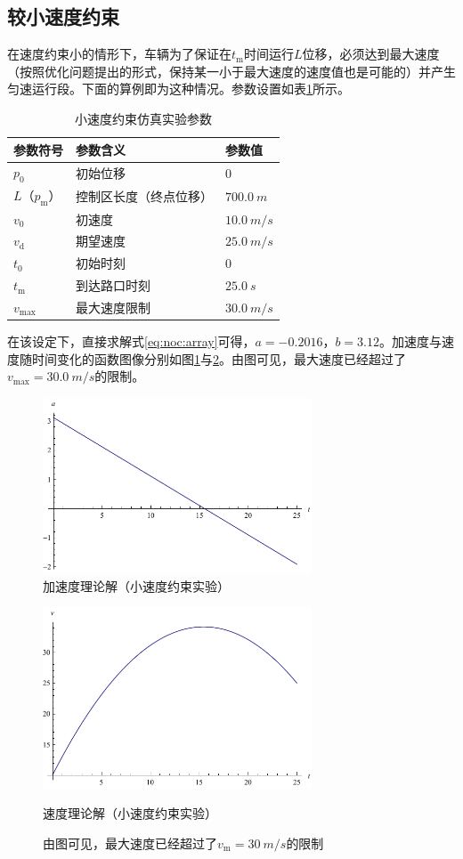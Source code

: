\subsection{较小速度约束}
在速度约束小的情形下，车辆为了保证在$t_\mathrm{m}$时间运行$L$位移，必须达到最大速度（按照优化问题提出的形式，保持某一小于最大速度的速度值也是可能的）并产生匀速运行段。下面的算例即为这种情况。参数设置如表\ref{tab:vsmall:param}所示。
\begin{table}[htbp]
\centering
\caption{小速度约束仿真实验参数}
\label{tab:vsmall:param}
\begin{tabular}{lll}
\toprule[1.5pt]
参数符号 & 参数含义 & 参数值 \\
\midrule[1pt]
$p_0$ & 初始位移 & $0$ \\
$L$（$p_\mathrm{m}$） & 控制区长度（终点位移） & $\SI{700.0}{m}$ \\
$v_0$ & 初速度 & $\SI{10.0}{m\per s}$ \\
$v_\mathrm{d}$ & 期望速度 & $\SI{25.0}{m\per s}$ \\
$t_0$ & 初始时刻 & $0$ \\
$t_\mathrm{m}$ & 到达路口时刻 & $\SI{25.0}{s}$ \\
$v_{\max}$ & 最大速度限制 & $\SI{30.0}{m\per s}$ \\
\bottomrule[1.5pt]
\end{tabular}
\end{table}

在该设定下，直接求解式\eqref{eq:noc:array}可得，$a=-0.2016$，$b=3.12$。加速度与速度随时间变化的函数图像分别如图\ref{fig:na}与\ref{fig:nv}。由图可见，最大速度已经超过了$v_{\max}=\SI{30.0}{m\per s}$的限制。
\begin{figure}[htbp]
\centering
\includegraphics[width=8cm]{figures/vopt/na.pdf}
\caption{加速度理论解（小速度约束实验）}
\label{fig:na}
\end{figure}
\begin{figure}[htbp]
\centering
\includegraphics[width=8cm]{figures/vopt/nv.pdf}
\caption{速度理论解（小速度约束实验）}
\caption*{\small 由图可见，最大速度已经超过了$v_\mathrm{m}=\SI{30}{m\per s}$的限制}
\label{fig:nv}
\end{figure}

